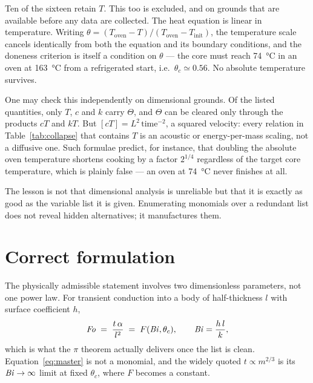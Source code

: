 Ten of the sixteen retain $T$. This too is excluded, and on grounds that
are available before any data are collected. The heat equation is linear
in temperature. Writing $\theta = (T_{\text{oven}}-T)/(T_{\text{oven}}-
T_{\text{init}})$, the temperature scale cancels identically from both the
equation and its boundary conditions, and the doneness criterion is itself
a condition on $\theta$ --- the core must reach \SI{74}{\celsius} in an
oven at \SI{163}{\celsius} from a refrigerated start, i.e.\ $\theta_{c}
\simeq 0.56$. No absolute temperature survives.

One may check this independently on dimensional grounds. Of the listed
quantities, only $T$, $c$ and $k$ carry $\Theta$, and $\Theta$ can be
cleared only through the products $cT$ and $kT$. But $[cT] = L^{2}\,
\mathrm{time}^{-2}$, a squared velocity: every relation in
Table~\ref{tab:collapse} that contains $T$ is an acoustic or
energy-per-mass scaling, not a diffusive one. Such formulae predict, for
instance, that doubling the absolute oven temperature shortens cooking by
a factor $2^{1/4}$ regardless of the target core temperature, which is
plainly false --- an oven at \SI{74}{\celsius} never finishes at all.

The lesson is not that dimensional analysis is unreliable but that it is
exactly as good as the variable list it is given. Enumerating monomials
over a redundant list does not reveal hidden alternatives; it manufactures
them.

\section{Correct formulation}
\label{sec:correct}

The physically admissible statement involves two dimensionless parameters,
not one power law. For transient conduction into a body of half-thickness
$l$ with surface coefficient $h$,
\begin{equation}
\mathit{Fo} \;=\; \frac{t\,\alpha}{l^{2}} \;=\; F(\mathit{Bi},\theta_{c}),
\qquad
\mathit{Bi} = \frac{h\,l}{k},
\label{eq:master}
\end{equation}
which is what the $\pi$ theorem actually delivers once the list is clean.
Equation~\eqref{eq:master} is not a monomial, and the widely quoted
$t \propto m^{2/3}$ is its $\mathit{Bi} \to \infty$ limit at fixed $\theta_{c}$,
where $F$ becomes a constant.

